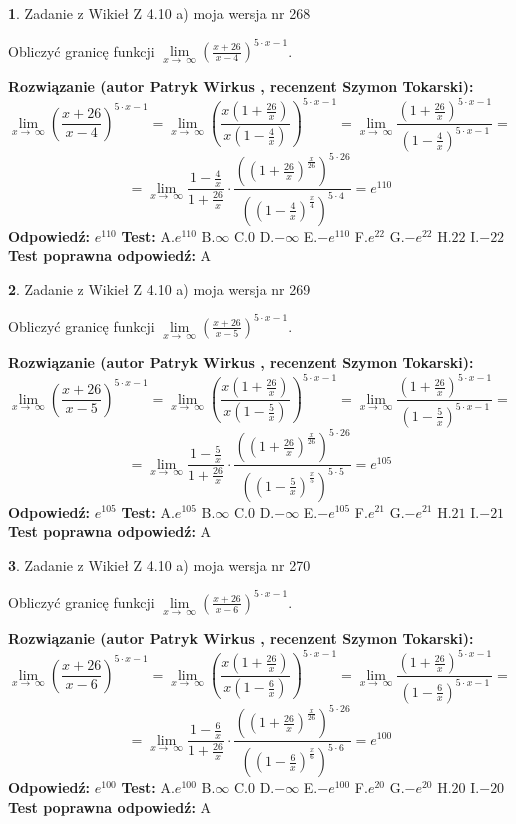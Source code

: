 \documentclass[12pt, a4paper]{article}
\theoremstyle{definition} %
\newtheorem{zad}{}
\newcommand{\zadStart}[1]{\begin{zad}#1\newline}
\newcommand{\zadStop}{\end{zad}}
\newcommand{\rozwStart}[2]{\noindent \textbf{Rozwiązanie (autor #1 , recenzent #2): }\newline}
\newcommand{\rozwStop}{\newline}
\newcommand{\odpStart}{\noindent \textbf{Odpowiedź:}\newline}
\newcommand{\odpStop}{\newline}
\newcommand{\testStart}{\noindent \textbf{Test:}\newline}
\newcommand{\testStop}{\newline}
\newcommand{\kluczStart}{\noindent \textbf{Test poprawna odpowiedź:}\newline}
\newcommand{\kluczStop}{\newline}
\begin{document}
\zadStart{Zadanie z Wikieł Z 4.10 a) moja wersja nr 268}

Obliczyć granicę funkcji  $\lim\limits_{x\to\ \infty}(\frac{x+26}{x-4})^{5\cdot x-1}$.
\zadStop
\rozwStart{Patryk Wirkus}{Szymon Tokarski}
$$\lim\limits_{x\to\ \infty}(\frac{x+26}{x-4})^{5\cdot x-1} = \lim\limits_{x\to\ \infty}(\frac{x(1+\frac{26}{x})}{x(1-\frac{4}{x})})^{5\cdot x-1}=\lim\limits_{x\to\ \infty}\frac{(1+\frac{26}{x})^{5\cdot x-1}}{(1-\frac{4}{x})^{5\cdot x-1}}=$$
$$=\lim\limits_{x\to\ \infty}\frac{1-\frac{4}{x}}{1+\frac{26}{x}}\cdot\frac{((1+\frac{26}{x})^{\frac{x}{26}})^{5\cdot26}}{((1-\frac{4}{x})^{\frac{x}{4}})^{5\cdot4}}=e^{110}$$
\rozwStop
\odpStart
$e^{110}$
\odpStop
\testStart
A.$e^{110}$ B.$\infty$ C.$0$ D.$-\infty$ E.$-e^{110}$
F.$e^{22}$ G.$-e^{22}$
H.$22$
I.$-22$
\testStop
\kluczStart
A
\kluczStop



\zadStart{Zadanie z Wikieł Z 4.10 a) moja wersja nr 269}

Obliczyć granicę funkcji  $\lim\limits_{x\to\ \infty}(\frac{x+26}{x-5})^{5\cdot x-1}$.
\zadStop
\rozwStart{Patryk Wirkus}{Szymon Tokarski}
$$\lim\limits_{x\to\ \infty}(\frac{x+26}{x-5})^{5\cdot x-1} = \lim\limits_{x\to\ \infty}(\frac{x(1+\frac{26}{x})}{x(1-\frac{5}{x})})^{5\cdot x-1}=\lim\limits_{x\to\ \infty}\frac{(1+\frac{26}{x})^{5\cdot x-1}}{(1-\frac{5}{x})^{5\cdot x-1}}=$$
$$=\lim\limits_{x\to\ \infty}\frac{1-\frac{5}{x}}{1+\frac{26}{x}}\cdot\frac{((1+\frac{26}{x})^{\frac{x}{26}})^{5\cdot26}}{((1-\frac{5}{x})^{\frac{x}{5}})^{5\cdot5}}=e^{105}$$
\rozwStop
\odpStart
$e^{105}$
\odpStop
\testStart
A.$e^{105}$ B.$\infty$ C.$0$ D.$-\infty$ E.$-e^{105}$
F.$e^{21}$ G.$-e^{21}$
H.$21$
I.$-21$
\testStop
\kluczStart
A
\kluczStop



\zadStart{Zadanie z Wikieł Z 4.10 a) moja wersja nr 270}

Obliczyć granicę funkcji  $\lim\limits_{x\to\ \infty}(\frac{x+26}{x-6})^{5\cdot x-1}$.
\zadStop
\rozwStart{Patryk Wirkus}{Szymon Tokarski}
$$\lim\limits_{x\to\ \infty}(\frac{x+26}{x-6})^{5\cdot x-1} = \lim\limits_{x\to\ \infty}(\frac{x(1+\frac{26}{x})}{x(1-\frac{6}{x})})^{5\cdot x-1}=\lim\limits_{x\to\ \infty}\frac{(1+\frac{26}{x})^{5\cdot x-1}}{(1-\frac{6}{x})^{5\cdot x-1}}=$$
$$=\lim\limits_{x\to\ \infty}\frac{1-\frac{6}{x}}{1+\frac{26}{x}}\cdot\frac{((1+\frac{26}{x})^{\frac{x}{26}})^{5\cdot26}}{((1-\frac{6}{x})^{\frac{x}{6}})^{5\cdot6}}=e^{100}$$
\rozwStop
\odpStart
$e^{100}$
\odpStop
\testStart
A.$e^{100}$ B.$\infty$ C.$0$ D.$-\infty$ E.$-e^{100}$
F.$e^{20}$ G.$-e^{20}$
H.$20$
I.$-20$
\testStop
\kluczStart
A
\kluczStop
\end{document}

